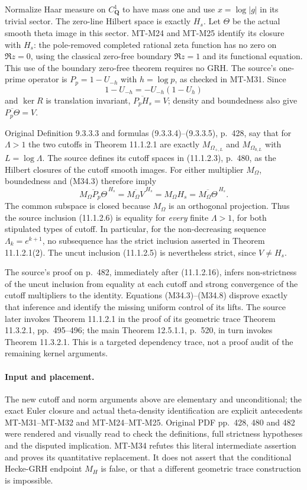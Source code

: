 Normalize Haar measure on $C_{\mathbf Q}^1$ to have
mass one and use $x=\log|g|$ in its trivial sector.
The zero-line Hilbert space is exactly $H_s$.
Let $\Theta$ be the actual smooth theta image in this
sector.  MT-M24 and MT-M25 identify its closure with
$H_s$: the pole-removed completed rational zeta function
has no zero on $\Re z=0$, using the classical zero-free
boundary $\Re z=1$ and its functional equation.
This use of the boundary zero-free theorem requires no
GRH.  The source's one-prime operator is
$P_p=1-U_{-h}$ with $h=\log p$, as checked in MT-M31.
Since
\[
                    1-U_{-h}=-U_{-h}(1-U_h)
 \tag{M34.22}
\]
and $\ker R$ is translation invariant,
$\overline{P_pH_s}=V$; density and boundedness also give
$\overline{P_p\Theta}=V$.

Original Definition 9.3.3.3 and formulas
(9.3.3.4)--(9.3.3.5), p.~428, say that for $\Lambda>1$
the two cutoffs in Theorem 11.1.2.1 are exactly
$M_{\Omega_{+,L}}$ and $M_{\Omega_{0,L}}$ with
$L=\log\Lambda$.  The source defines its cutoff spaces
in (11.1.2.3), p.~480, as the Hilbert closures of the
cutoff smooth images.  For either multiplier $M_\Omega$,
boundedness and (M34.3) therefore imply
\[
 \overline{M_\Omega P_p\Theta}^{\,H_s}
       =\overline{M_\Omega V}^{\,H_s}
       =M_\Omega H_s
       =\overline{M_\Omega\Theta}^{\,H_s}.
 \tag{M34.23}
\]
The common subspace is closed because $M_\Omega$ is an
orthogonal projection.  Thus the source inclusion
(11.1.2.6) is equality for \emph{every} finite $\Lambda>1$,
for both stipulated types of cutoff.  In particular, for
the non-decreasing sequence $\Lambda_k=e^{k+1}$, no
subsequence has the strict inclusion asserted in
Theorem 11.1.2.1(2).  The uncut inclusion (11.1.2.5)
is nevertheless strict, since $V\ne H_s$.

The source's proof on p.~482, immediately after
(11.1.2.16), infers non-strictness of the uncut inclusion
from equality at each cutoff and strong convergence of
the cutoff multipliers to the identity.  Equations
(M34.3)--(M34.8) disprove exactly that inference and
identify the missing uniform control of its lifts.
The source later invokes Theorem 11.1.2.1 in the proof
of its geometric trace Theorem 11.3.2.1, pp.~495--496;
the main Theorem 12.5.1.1, p.~520, in turn invokes
Theorem 11.3.2.1.  This is a targeted dependency trace,
not a proof audit of the remaining kernel arguments.

\paragraph{Input and placement.}
The new cutoff and norm arguments above are elementary
and unconditional; the exact Euler closure and actual
theta-density identification are explicit antecedents
MT-M31--MT-M32 and MT-M24--MT-M25.  Original PDF
pp.~428, 480 and 482 were rendered and visually read
to check the definitions, full strictness hypotheses and
the disputed implication.  MT-M34 refutes this literal
intermediate assertion and proves its quantitative
replacement.  It does not assert that the conditional
Hecke-GRH endpoint $M_H$ is false, or that a different
geometric trace construction is impossible.

